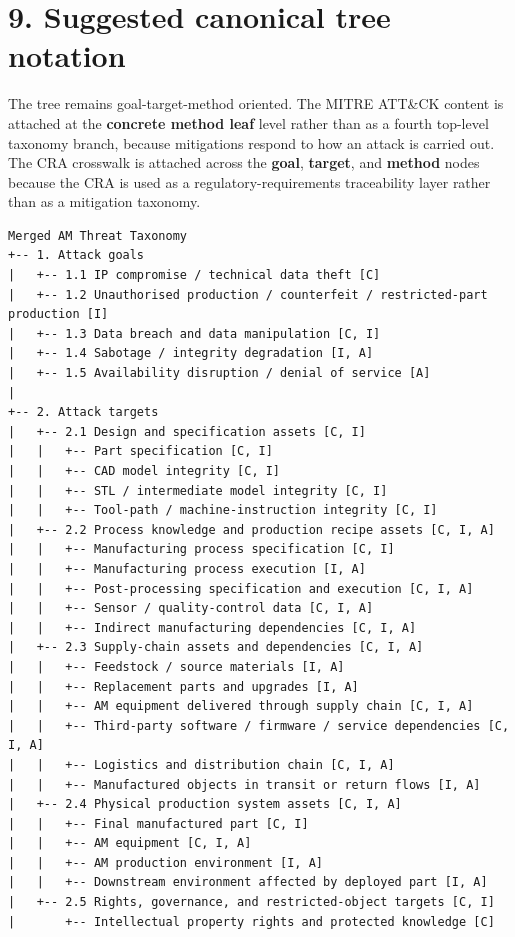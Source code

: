 \documentclass[10pt,a4paper,oneside]{report}
\begin{document}
\chapter{9. Suggested canonical tree notation}


The tree remains goal-target-method oriented. The MITRE ATT\&CK content is attached at the \textbf{concrete method leaf} level rather than as a fourth top-level taxonomy branch, because mitigations respond to how an attack is carried out. The CRA crosswalk is attached across the \textbf{goal}, \textbf{target}, and \textbf{method} nodes because the CRA is used as a regulatory-requirements traceability layer rather than as a mitigation taxonomy.

\begin{Verbatim}[fontsize=\small,breaklines=true,breakanywhere=true]
Merged AM Threat Taxonomy
+-- 1. Attack goals
|   +-- 1.1 IP compromise / technical data theft [C]
|   +-- 1.2 Unauthorised production / counterfeit / restricted-part production [I]
|   +-- 1.3 Data breach and data manipulation [C, I]
|   +-- 1.4 Sabotage / integrity degradation [I, A]
|   +-- 1.5 Availability disruption / denial of service [A]
|
+-- 2. Attack targets
|   +-- 2.1 Design and specification assets [C, I]
|   |   +-- Part specification [C, I]
|   |   +-- CAD model integrity [C, I]
|   |   +-- STL / intermediate model integrity [C, I]
|   |   +-- Tool-path / machine-instruction integrity [C, I]
|   +-- 2.2 Process knowledge and production recipe assets [C, I, A]
|   |   +-- Manufacturing process specification [C, I]
|   |   +-- Manufacturing process execution [I, A]
|   |   +-- Post-processing specification and execution [C, I, A]
|   |   +-- Sensor / quality-control data [C, I, A]
|   |   +-- Indirect manufacturing dependencies [C, I, A]
|   +-- 2.3 Supply-chain assets and dependencies [C, I, A]
|   |   +-- Feedstock / source materials [I, A]
|   |   +-- Replacement parts and upgrades [I, A]
|   |   +-- AM equipment delivered through supply chain [C, I, A]
|   |   +-- Third-party software / firmware / service dependencies [C, I, A]
|   |   +-- Logistics and distribution chain [C, I, A]
|   |   +-- Manufactured objects in transit or return flows [I, A]
|   +-- 2.4 Physical production system assets [C, I, A]
|   |   +-- Final manufactured part [C, I]
|   |   +-- AM equipment [C, I, A]
|   |   +-- AM production environment [I, A]
|   |   +-- Downstream environment affected by deployed part [I, A]
|   +-- 2.5 Rights, governance, and restricted-object targets [C, I]
|       +-- Intellectual property rights and protected knowledge [C]

\end{Verbatim}
\end{document}
